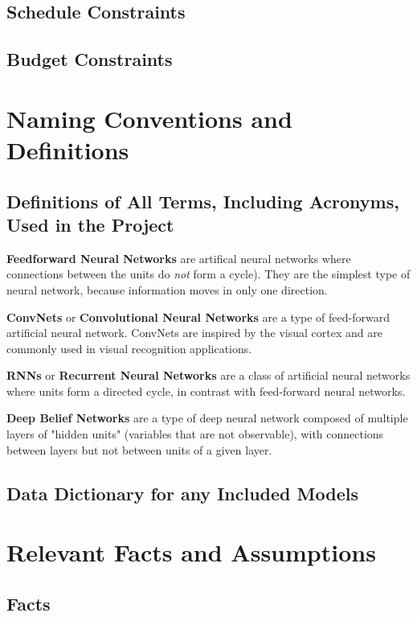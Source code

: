 \documentclass{scrreprt}
\begin{document}
\subsection{Schedule Constraints}

\subsection{Budget Constraints}

\section{Naming Conventions and Definitions}

\subsection{Definitions of All Terms, Including Acronyms, Used in the Project}

\textbf{Feedforward Neural Networks} are artifical neural networks where
connections between the units do \textit{not} form a cycle). They are the
simplest type of neural network, because information moves in only one
direction.

\textbf{ConvNets} or \textbf{Convolutional Neural Networks} are a type of
feed-forward artificial neural network. ConvNets are inspired by the visual
cortex and are commonly used in visual recognition applications.

\textbf{RNNs} or \textbf{Recurrent Neural Networks} are a class of artificial
neural networks where units form a directed cycle, in contrast with
feed-forward neural networks.

\textbf{Deep Belief Networks} are a type of deep neural network composed of
multiple layers of "hidden units" (variables that are not observable), with
connections between layers but not between units of a given layer.

\subsection{Data Dictionary for any Included Models}

\section{Relevant Facts and Assumptions}

\subsection{Facts}
\end{document}
